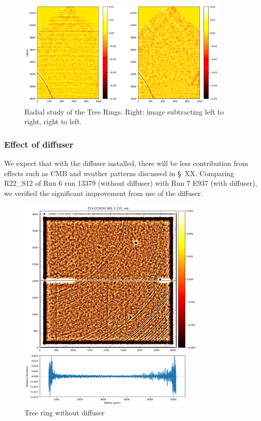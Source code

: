 \begin{figure}
\centering
\includegraphics[width=0.9\textwidth]{figures/TR_radial.png}
\caption{Radial study of the Tree Rings. Right: image subtracting left to right, right to left.}
\end{figure}

\clearpage
\subsubsection{Effect of diffuser}
We expect that with the diffuser installed, there will be less contribution from effects such as CMB and weather patterns discussed in \S~XX. Comparing R22\_S12 of Run 6 run 13379 (without diffuser) with Run 7 E937 (with diffuser), we verified the significant improvement from use of the diffuser.

\begin{figure}
\centering
\includegraphics[width=0.8\textwidth]{figures/TR_wo_diffuser.png}
\caption{Tree ring without diffuser}
\end{figure}


